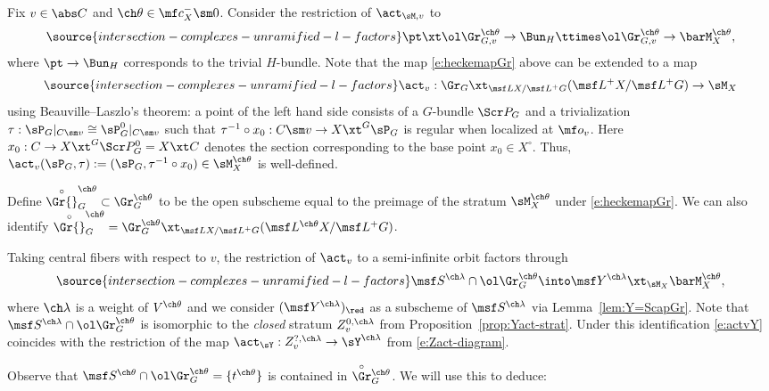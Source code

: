 Fix $v\in \abs C$ and $\ch\theta \in \mf c_X^- \sm 0$.
Consider the restriction of $\act_{\sM,v}$ to
\begin{equation} \label{e:heckemapGr}
\source{intersection-complexes-unramified-l-factors}
    \pt \xt \ol\Gr^{\ch\theta}_{G,v} \to \Bun_H \ttimes \ol\Gr^{\ch\theta}_{G,v}
\to \barM_X^{\ch\theta},
\end{equation}
where $\pt \to \Bun_H$ corresponds to the trivial $H$-bundle.
Note that the map \eqref{e:heckemapGr} above can be
extended to a map
\begin{equation}\label{e:actHG}
\source{intersection-complexes-unramified-l-factors}
    \act_{v} : \Gr_G \xt_{\msf L X/\msf L^+G} (\msf L^+X/\msf L^+G) \to \sM_X
\end{equation}
using Beauville--Laszlo's theorem: a point of the left hand side
consists of a $G$-bundle $\Scr P_G$ and a trivialization
$\tau : \sP_G|_{C\sm v} \cong \sP_G^0|_{C\sm v}$ such that
$\tau^{-1} \circ x_0 : C\sm v \to X \xt^G \sP_G$ is regular when localized at $\mf o_v$.
Here $x_0 : C \to X \xt^G \Scr P_G^0 = X \xt C$ denotes the section corresponding to
the base point $x_0\in X^\circ$.
Thus, $\act_{v}(\sP_G,\tau) := (\sP_G, \tau^{-1}\circ x_0) \in \sM_X^{\ch\theta}$
is well-defined.

Define $\overset\circ\Gr{}^{\ch\theta}_G \subset \Gr^{\ch\theta}_G$ to be the
open subscheme equal to the preimage
of the stratum $\sM_X^{\ch\theta}$ under \eqref{e:heckemapGr}.
We can also identify
$ \overset\circ\Gr{}_G^{\ch\theta} = \Gr^{\ch\theta}_G \xt_{\msf L X/\msf L^+G} (\msf L^{\ch\theta}X / \msf L^+G)$.


Taking central fibers with respect to $v$,
the restriction of $\act_v$ to a semi-infinite orbit
factors through
\begin{equation}
 \label{e:actvY}
\source{intersection-complexes-unramified-l-factors}
 \msf S^{\ch\lambda} \cap \ol\Gr^{\ch\theta}_G \into \msf Y^{\ch\lambda}\xt_{\sM_X} \barM_X^{\ch\theta},
\end{equation}
where $\ch\lambda$ is a weight of $V^{\ch\theta}$
and we consider $(\msf Y^{\ch\lambda})_\red$ as a subscheme of $\msf S^{\ch\lambda}$ via
Lemma~\ref{lem:Y=ScapGr}.
Note that $\msf S^{\ch\lambda}\cap\ol\Gr_G^{\ch\theta}$ is isomorphic to
the \emph{closed} stratum $Z_v^{0,\ch\lambda}$ from Proposition~\ref{prop:Yact-strat}.
Under this identification \eqref{e:actvY} coincides with the restriction of the map $\act_\sY:Z_v^{?,\ch\lambda}\to \sY^{\ch\lambda}$ from \eqref{e:Zact-diagram}.

Observe that $\msf S^{\ch\theta} \cap \ol\Gr^{\ch\theta}_G = \{ t^{\ch\theta} \}$
is contained in $\overset\circ{\Gr}{}^{\ch\theta}_G$.
We will use this to deduce:

